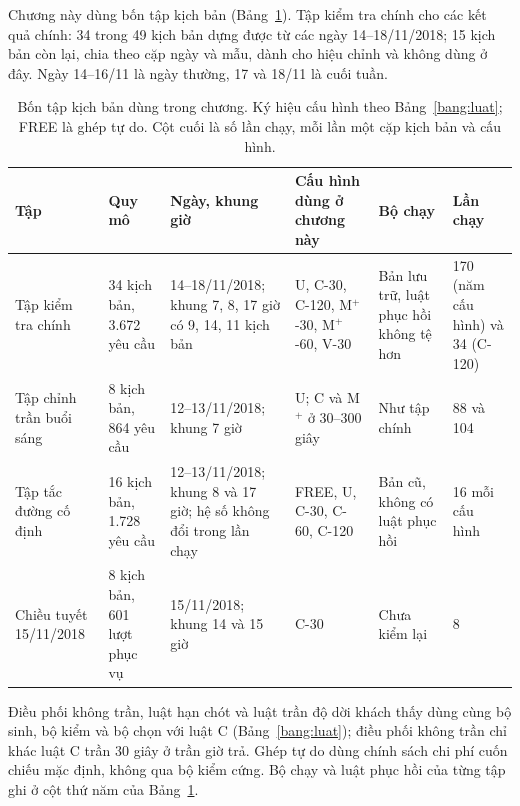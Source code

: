 Chương này dùng bốn tập kịch bản (Bảng~\ref{bang:c4-taptu}). Tập kiểm tra chính cho các kết quả chính:
34 trong 49 kịch bản dựng được từ các ngày 14--18/11/2018; 15 kịch bản còn lại, chia theo cặp ngày và
mẫu, dành cho hiệu chỉnh và không dùng ở đây. Ngày 14--16/11 là ngày thường, 17 và 18/11 là cuối tuần.

\begin{table}[htbp]
\centering
\caption{Bốn tập kịch bản dùng trong chương. Ký hiệu cấu hình theo Bảng~\ref{bang:luat}; FREE là ghép
tự do. Cột cuối là số lần chạy, mỗi lần một cặp kịch bản và cấu hình.}
\label{bang:c4-taptu}
\footnotesize
\setlength{\tabcolsep}{3pt}
\begin{tabular}{@{}p{2.5cm}p{1.9cm}p{3.1cm}p{3.0cm}p{2.6cm}p{1.9cm}@{}}
\toprule
\textbf{Tập} & \textbf{Quy mô} & \textbf{Ngày, khung giờ} & \textbf{Cấu hình dùng ở chương này} &
\textbf{Bộ chạy} & \textbf{Lần chạy}\\
\midrule
Tập kiểm tra chính & 34 kịch bản, 3.672 yêu cầu & 14--18/11/2018; khung 7, 8, 17 giờ có 9, 14, 11
kịch bản & U, C-30, C-120, M$^{+}$-30, M$^{+}$-60, V-30 & Bản lưu trữ, luật phục hồi không tệ hơn &
170 (năm cấu hình) và 34 (C-120)\\
Tập chỉnh trần buổi sáng & 8 kịch bản, 864 yêu cầu & 12--13/11/2018; khung 7 giờ & U; C và M$^{+}$ ở
30--300 giây & Như tập chính & 88 và 104\\
Tập tắc đường cố định & 16 kịch bản, 1.728 yêu cầu & 12--13/11/2018; khung 8 và 17 giờ; hệ số không
đổi trong lần chạy & FREE, U, C-30, C-60, C-120 & Bản cũ, không có luật phục hồi & 16 mỗi cấu hình\\
Chiều tuyết 15/11/2018 & 8 kịch bản, 601 lượt phục vụ & 15/11/2018; khung 14 và 15 giờ & C-30 &
Chưa kiểm lại & 8\\
\bottomrule
\end{tabular}
\end{table}

Điều phối không trần, luật hạn chót và luật trần độ dời khách thấy dùng cùng bộ sinh, bộ kiểm và bộ chọn
với luật C (Bảng~\ref{bang:luat}); điều phối không trần chỉ khác luật C trần 30 giây ở trần giờ trả. Ghép
tự do dùng chính sách chi phí cuốn chiếu mặc định, không qua bộ kiểm cứng. Bộ chạy và luật phục hồi của
từng tập ghi ở cột thứ năm của Bảng~\ref{bang:c4-taptu}.

